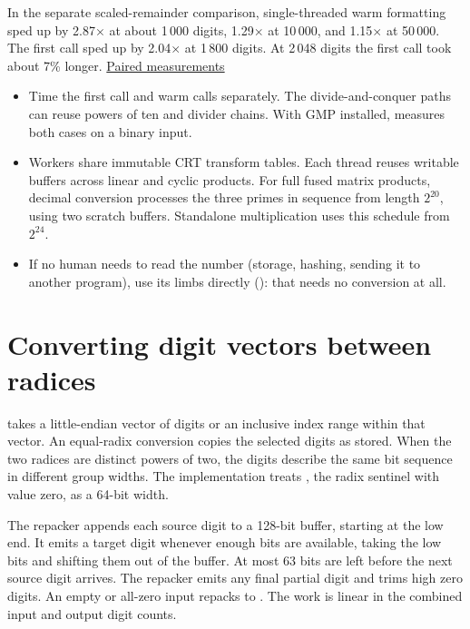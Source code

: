 \begin{perfnote}
In the separate scaled-remainder comparison, single-threaded warm
formatting sped up by 2.87$\times$ at about 1\,000 digits,
1.29$\times$ at 10\,000, and 1.15$\times$ at 50\,000. The first call
sped up by 2.04$\times$ at 1\,800 digits. At 2\,048 digits the
first call took about 7\% longer.
\href{https://github.com/mmurshed/biginteger/blob/main/BENCHMARK.md\#scaled-remainder-decimal-formatting}{Paired measurements}
\end{perfnote}

\begin{practice}
\begin{itemize}
  \item Time the first call and warm calls separately. The divide-and-conquer
        paths can reuse powers of ten and divider chains. With GMP installed,
         measures both cases on a binary input.
  \item Workers share immutable CRT transform tables. Each thread reuses writable buffers
        across linear and cyclic products. For full fused matrix products, decimal conversion
        processes the three primes in sequence from length $2^{20}$, using two scratch
        buffers. Standalone multiplication uses this schedule from $2^{24}$.
  \item If no human needs to read the number (storage, hashing, sending it to another
        program), use its limbs directly (): that needs no conversion at all.
\end{itemize}
\end{practice}

\newpage
\section{Converting digit vectors between radices}
\label{sec:convertbase}

 takes a little-endian vector of digits or an inclusive
index range within that vector. An equal-radix conversion copies the selected
digits as stored. When the two radices are distinct powers of two, the digits
describe the same bit sequence in different group widths. The implementation
treats , the radix sentinel with value zero, as a 64-bit width.

The repacker appends each source digit to a 128-bit buffer, starting at the low
end. It emits a target digit whenever enough bits are available, taking the
low bits and shifting them out of the buffer. At most 63 bits are left before
the next source digit arrives. The repacker emits any final partial digit and
trims high zero digits. An empty or all-zero input repacks to .
The work is linear in the combined input and output digit counts.

